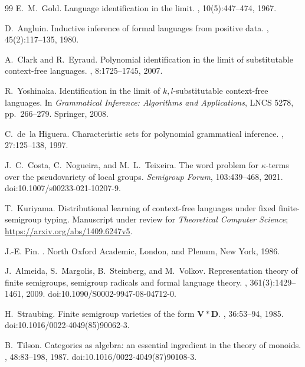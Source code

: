 \begin{thebibliography}{99}
E.~M.~Gold.
\newblock Language identification in the limit.
, 10(5):447--474, 1967.

D.~Angluin.
\newblock Inductive inference of formal languages from positive data.
, 45(2):117--135, 1980.

A.~Clark and R.~Eyraud.
\newblock Polynomial identification in the limit of substitutable context-free
languages.
, 8:1725--1745, 2007.

R.~Yoshinaka.
\newblock Identification in the limit of $k,l$-substitutable context-free
languages.
\newblock In {\em Grammatical Inference: Algorithms and Applications},
LNCS 5278, pp.~266--279. Springer, 2008.

C.~de~la Higuera.
\newblock Characteristic sets for polynomial grammatical inference.
, 27:125--138, 1997.

J.~C.~Costa, C.~Nogueira, and M.~L.~Teixeira.
\newblock The word problem for $\kappa$-terms over the
pseudovariety of local groups.
\newblock \emph{Semigroup Forum}, 103:439--468, 2021.
\newblock doi:10.1007/s00233-021-10207-9.

T.~Kuriyama.
\newblock Distributional learning of context-free languages under fixed
finite-semigroup typing.
\newblock Manuscript under review for \emph{Theoretical Computer Science};
\url{https://arxiv.org/abs/1409.6247v5}.

J.-E. Pin.
.
\newblock North Oxford Academic, London, and Plenum, New York, 1986.

J.~Almeida, S.~Margolis, B.~Steinberg, and M.~Volkov.
\newblock Representation theory of finite semigroups, semigroup radicals and
formal language theory.
,
361(3):1429--1461, 2009.
\newblock doi:10.1090/S0002-9947-08-04712-0.

H.~Straubing.
\newblock Finite semigroup varieties of the form $\mathbf V*\mathbf D$.
, 36:53--94, 1985.
\newblock doi:10.1016/0022-4049(85)90062-3.

B.~Tilson.
\newblock Categories as algebra: an essential ingredient in the theory of monoids.
, 48:83--198, 1987.
\newblock doi:10.1016/0022-4049(87)90108-3.

\end{thebibliography}

